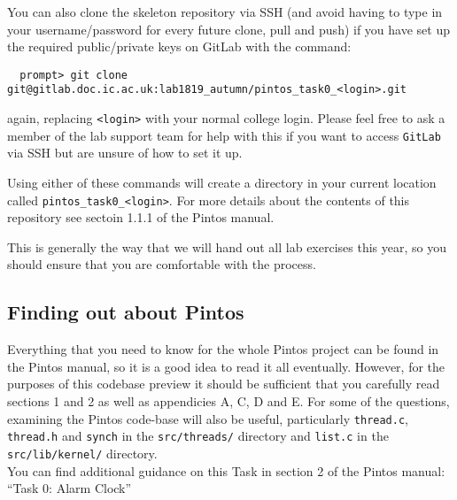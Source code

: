 \documentclass[a4paper,12pt]{article}
\newcommand{\shell}[1]{\lstinline!#1!}
\begin{document}
You can also clone the skeleton repository via SSH (and avoid having to type in your username/password for every future clone, pull and push) if you have set up the required public/private keys on GitLab with the command:
%
\begin{lstlisting}
  prompt> git clone git@gitlab.doc.ic.ac.uk:lab1819_autumn/pintos_task0_<login>.git
\end{lstlisting}
%
again, replacing \shell{<login>} with your normal college login.
Please feel free to ask a member of the lab support team for help with this if you want to access \shell{GitLab} via SSH but are unsure of how to set it up.

Using either of these commands will create a directory in your current location called \shell{pintos_task0_<login>}.
For more details about the contents of this repository see sectoin 1.1.1 of the Pintos manual.

This is generally the way that we will hand out all lab exercises this year, so you should ensure that you are comfortable with the process.


\subsection*{Finding out about Pintos}
Everything that you need to know for the whole Pintos project can be found in the Pintos manual, 
so it is a good idea to read it all eventually.
However, for the purposes of this codebase preview it should be sufficient that you carefully read sections 1 and 2 
as well as appendicies A, C, D and E. 
For some of the questions, examining the Pintos code-base will also be useful, 
particularly \shell{thread.c}, \shell{thread.h} and \shell{synch} in the \shell{src/threads/} directory
and \shell{list.c} in the \shell{src/lib/kernel/} directory.\\

\noindent You can find additional guidance on this Task in section 2 of the Pintos manual: ``Task 0: Alarm Clock''
\end{document}
